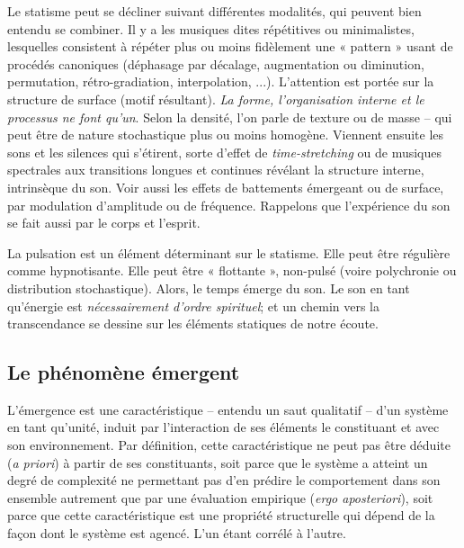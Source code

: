 \documentclass{article}
\begin{document}
Le statisme peut se décliner suivant différentes modalités, qui peuvent bien entendu se combiner. Il y a les musiques dites répétitives ou minimalistes, lesquelles consistent à répéter plus ou moins fidèlement une « pattern » usant de procédés canoniques (déphasage par décalage, augmentation ou diminution, permutation, rétro-gradiation, interpolation, ...). L'attention est portée sur la structure de surface (motif résultant). \textit{La  forme, l'organisation interne et le processus ne font qu'un}. %
 Selon la densité, l'on parle de texture ou de masse -- qui peut être de nature stochastique plus ou moins homogène. Viennent ensuite les sons et les silences qui s'étirent, sorte d'effet de \textit{time-stretching} ou de musiques spectrales aux transitions longues et continues révélant la structure interne, intrinsèque du son. Voir aussi les effets de battements émergeant ou de surface, par modulation d'amplitude ou de fréquence. Rappelons que l'expérience du son se fait aussi par le corps et l'esprit. 

La pulsation est un élément déterminant sur le statisme. Elle peut être régulière comme hypnotisante. Elle peut être « flottante », non-pulsé (voire polychronie ou distribution stochastique). Alors, le temps émerge du son. Le son en tant qu'énergie est \textit{nécessairement d’ordre spirituel}; %
et un chemin vers la transcendance se dessine sur les éléments statiques de notre écoute.

\subsection*{Le phénomène émergent}
\label{emergent}
 
 L'émergence est une caractéristique -- entendu un saut qualitatif -- d'un système en tant qu'unité, induit par l'interaction de ses éléments le constituant et avec son environnement. Par définition, cette caractéristique ne peut pas être déduite (\textit{a priori}) à partir de ses constituants, soit parce que le système a atteint un degré de complexité ne permettant pas d'en prédire le comportement dans son ensemble autrement que par une évaluation empirique (\textit{ergo aposteriori}), soit parce que cette caractéristique est une propriété structurelle qui dépend de la façon dont le système est agencé. 
 L'un étant corrélé à l'autre.
\end{document}
